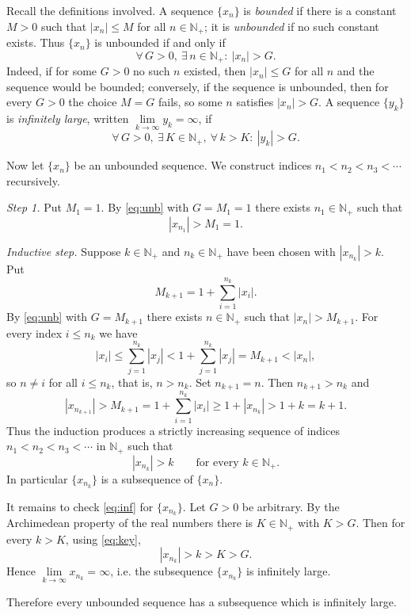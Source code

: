 \documentclass[11pt,a4paper]{article}
\newenvironment{solution}[1]{%
  \par\addvspace{1.7ex}%
  \noindent{\color{solutioncolor}\textbf{#1}}\hspace{0.55em}\ignorespaces}%
  {\par\addvspace{0.9ex}}
\begin{document}
\begin{solution}{Solution 2.1.26}\label{es:2.1.26}
Recall the definitions involved. A sequence $\{x_n\}$ is \emph{bounded} if there is a
constant $M>0$ such that $|x_n|\le M$ for all $n\in\mathbb{N}_+$; it is
\emph{unbounded} if no such constant exists. Thus $\{x_n\}$ is unbounded if and only if
\begin{equation}\label{eq:unb}
\forall\, G>0,\ \exists\, n\in\mathbb{N}_+:\ |x_n|>G .
\end{equation}
Indeed, if for some $G>0$ no such $n$ existed, then $|x_n|\le G$ for all $n$ and the
sequence would be bounded; conversely, if the sequence is unbounded, then for every
$G>0$ the choice $M=G$ fails, so some $n$ satisfies $|x_n|>G$. A sequence
$\{y_k\}$ is \emph{infinitely large}, written $\lim\limits_{k\to\infty}y_k=\infty$, if
\begin{equation}\label{eq:inf}
\forall\, G>0,\ \exists\, K\in\mathbb{N}_+,\ \forall\, k>K:\ |y_k|>G .
\end{equation}

Now let $\{x_n\}$ be an unbounded sequence. We construct indices
$n_1<n_2<n_3<\cdots$ recursively.

\emph{Step 1.} Put $M_1=1$. By \eqref{eq:unb} with $G=M_1=1$ there exists
$n_1\in\mathbb{N}_+$ such that
\[
|x_{n_1}|>M_1=1 .
\]

\emph{Inductive step.} Suppose $k\in\mathbb{N}_+$ and $n_k\in\mathbb{N}_+$ have been
chosen with $|x_{n_k}|>k$. Put
\[
M_{k+1}=1+\sum_{i=1}^{n_k}|x_i| .
\]
By \eqref{eq:unb} with $G=M_{k+1}$ there exists $n\in\mathbb{N}_+$ such that
$|x_n|>M_{k+1}$. For every index $i\le n_k$ we have
\[
|x_i|\le\sum_{j=1}^{n_k}|x_j|<1+\sum_{j=1}^{n_k}|x_j|=M_{k+1}<|x_n| ,
\]
so $n\ne i$ for all $i\le n_k$, that is, $n>n_k$. Set $n_{k+1}=n$. Then
$n_{k+1}>n_k$ and
\[
|x_{n_{k+1}}|>M_{k+1}=1+\sum_{i=1}^{n_k}|x_i|\ge 1+|x_{n_k}|>1+k=k+1 .
\]
Thus the induction produces a strictly increasing sequence of indices
$n_1<n_2<n_3<\cdots$ in $\mathbb{N}_+$ such that
\begin{equation}\label{eq:key}
|x_{n_k}|>k\qquad\text{for every } k\in\mathbb{N}_+ .
\end{equation}
In particular $\{x_{n_k}\}$ is a subsequence of $\{x_n\}$.

It remains to check \eqref{eq:inf} for $\{x_{n_k}\}$. Let $G>0$ be arbitrary. By the
Archimedean property of the real numbers there is $K\in\mathbb{N}_+$ with $K>G$. Then
for every $k>K$, using \eqref{eq:key},
\[
|x_{n_k}|>k>K>G .
\]
Hence $\lim\limits_{k\to\infty}x_{n_k}=\infty$, i.e. the subsequence $\{x_{n_k}\}$ is
infinitely large.

Therefore every unbounded sequence has a subsequence which is infinitely large.
\end{solution}
\end{document}
